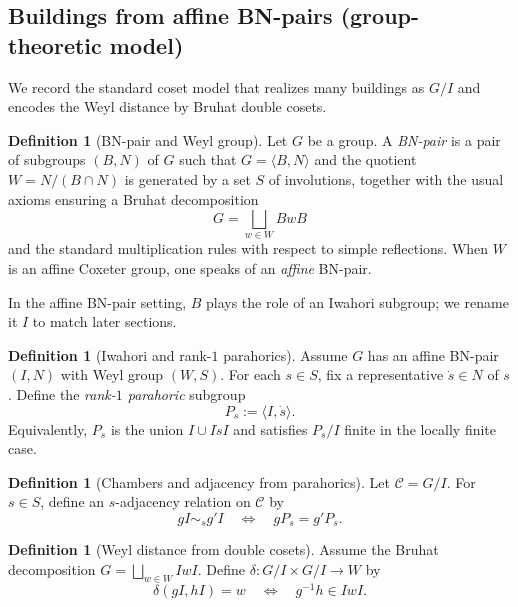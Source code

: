 \documentclass[11pt]{amsart}
\theoremstyle{definition}
\newtheorem{definition}[thm]{Definition}
\theoremstyle{remark}
\numberwithin{equation}{section}
\begin{document}
\subsection{Buildings from affine BN-pairs (group-theoretic model)}\label{subsec:bn-pair-building}

We record the standard coset model that realizes many buildings as $G/I$ and encodes
the Weyl distance by Bruhat double cosets.

\begin{definition}[BN-pair and Weyl group]\label{def:bn-pair}
Let $G$ be a group. A \emph{BN-pair} is a pair of subgroups $(B,N)$ of $G$ such that
$G=\langle B,N\rangle$ and the quotient $W=N/(B\cap N)$ is generated by a set $S$ of involutions,
together with the usual axioms ensuring a Bruhat decomposition
\[
G=\bigsqcup_{w\in W} BwB
\]
and the standard multiplication rules with respect to simple reflections.
When $W$ is an affine Coxeter group, one speaks of an \emph{affine} BN-pair.
\end{definition}

In the affine BN-pair setting, $B$ plays the role of an Iwahori subgroup; we rename it $I$ to match later sections.

\begin{definition}[Iwahori and rank-$1$ parahorics]\label{def:iwahori-parahoric-strong}
Assume $G$ has an affine BN-pair $(I,N)$ with Weyl group $(W,S)$.
For each $s\in S$, fix a representative $\dot{s}\in N$ of $s$.
Define the \emph{rank-$1$ parahoric} subgroup
\[
P_s:=\langle I,\dot{s}\rangle.
\]
Equivalently, $P_s$ is the union $I\cup I\dot{s}I$ and satisfies $P_s/I$ finite in the locally finite case.
\end{definition}

\begin{definition}[Chambers and adjacency from parahorics]\label{def:coset-chambers}
Let $\mathcal{C}=G/I$.
For $s\in S$, define an $s$-adjacency relation on $\mathcal{C}$ by
\[
gI \sim_s g'I \quad \Longleftrightarrow \quad gP_s = g'P_s.
\]
\end{definition}

\begin{definition}[Weyl distance from double cosets]\label{def:delta-doublecoset}
Assume the Bruhat decomposition $G=\bigsqcup_{w\in W} IwI$.
Define $\delta:G/I\times G/I\to W$ by
\[
\delta(gI,hI)=w \quad\Longleftrightarrow\quad g^{-1}h\in IwI.
\]
\end{definition}
\end{document}
